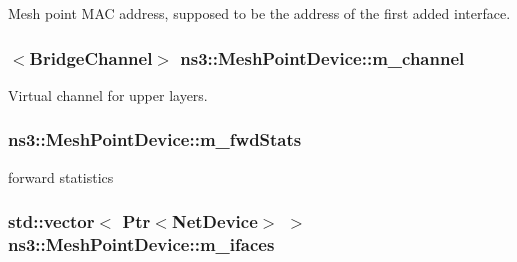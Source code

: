 Mesh point M\+AC address, supposed to be the address of the first added interface. 

\subsubsection[{\texorpdfstring{m\+\_\+channel}{m_channel}}]{$<${\bf Bridge\+Channel}$>$ ns3\+::\+Mesh\+Point\+Device\+::m\+\_\+channel\hspace{0.3cm}{\ttfamily [private]}}\hypertarget{classns3_1_1MeshPointDevice_a56185011f8d2654cf842a6273e9e398e}{}\label{classns3_1_1MeshPointDevice_a56185011f8d2654cf842a6273e9e398e}


Virtual channel for upper layers. 

\subsubsection[{\texorpdfstring{m\+\_\+fwd\+Stats}{m_fwdStats}}]{ ns3\+::\+Mesh\+Point\+Device\+::m\+\_\+fwd\+Stats\hspace{0.3cm}{\ttfamily [private]}}\hypertarget{classns3_1_1MeshPointDevice_a7e408ac2b047d923dffaf0945d28f80f}{}\label{classns3_1_1MeshPointDevice_a7e408ac2b047d923dffaf0945d28f80f}


forward statistics 

\subsubsection[{\texorpdfstring{m\+\_\+ifaces}{m_ifaces}}]{\setlength{\rightskip}{0pt plus 5cm}std\+::vector$<$ {\bf Ptr}$<${\bf Net\+Device}$>$ $>$ ns3\+::\+Mesh\+Point\+Device\+::m\+\_\+ifaces\hspace{0.3cm}{\ttfamily [private]}}\hypertarget{classns3_1_1MeshPointDevice_a651ebd5660f380c261cd9a055a95805d}{}\label{classns3_1_1MeshPointDevice_a651ebd5660f380c261cd9a055a95805d}


